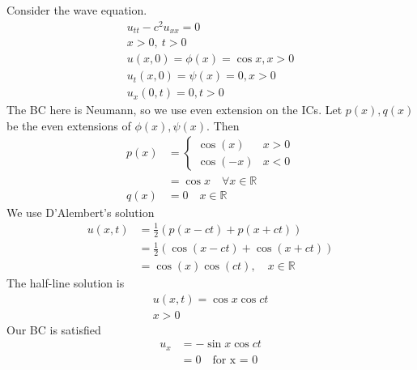 \documentclass[12pt, letterpaper]{article}
\begin{document}
 Consider the wave equation.
\begin{align*}
    u_{tt} - c^2u_{xx} = 0 \\
    x > 0,\ t > 0 \\
    u(x,0) = \phi(x) = \cos x, x > 0 \\
    u_t(x,0) = \psi(x) = 0, x > 0 \\
    u_x(0,t) = 0, t > 0
\end{align*}
The BC here is Neumann, so we use even extension on the ICs. Let $p(x),q(x)$ be the even 
extensions of $\phi(x), \psi(x)$. Then
\begin{align*}
    p(x) &= \begin{cases}
        \cos(x) & x > 0 \\
        \cos(-x) & x < 0
    \end{cases} \\ 
    &= \cos x \quad \forall x \in \mathbb{R} \\
    q(x) &= 0\quad x \in \mathbb{R}
\end{align*}
We use D'Alembert's solution 
\begin{align*}
    u(x,t) &= \frac 12 (p(x-ct) + p(x + ct)) \\
    &= \frac 12 (\cos(x-ct) + \cos(x+ct)) \\ 
    &= \cos(x)\cos(ct),\quad x \in \mathbb{R}
\end{align*}
The half-line solution is 
\begin{align*}
    u(x,t) = \cos x \cos ct \\
    x > 0
\end{align*}
Our BC is satisfied 
\begin{align*}
    u_x &= -\sin x \cos ct \\
    &= 0 \quad \text{for x = 0}
\end{align*}
\end{document}
